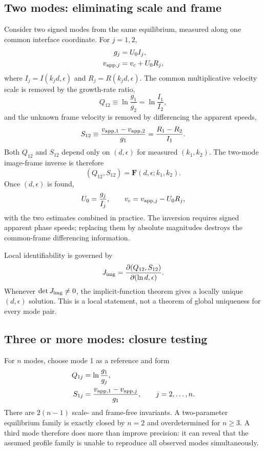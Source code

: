 \documentclass[linenumbers]{aastex7}
\begin{document}
\subsection{Two modes: eliminating scale and frame}
Consider two signed modes from the same equilibrium, measured along one common interface coordinate. For $j=1,2$,
\begin{align}
g_j &= U_0 I_j,\\
v_{{\rm app},j}&=v_c+U_0R_j,
\end{align}
where $I_j=I(k_jd,\epsilon)$ and $R_j=R(k_jd,\epsilon)$. The common multiplicative velocity scale is removed by the growth-rate ratio,
\begin{equation}
Q_{12}\equiv \ln\frac{g_1}{g_2}
=\ln\frac{I_1}{I_2},
\end{equation}
and the unknown frame velocity is removed by differencing the apparent speeds,
\begin{equation}
S_{12}\equiv\frac{v_{{\rm app},1}-v_{{\rm app},2}}{g_1}
=\frac{R_1-R_2}{I_1}.
\end{equation}
Both $Q_{12}$ and $S_{12}$ depend only on $(d,\epsilon)$ for measured $(k_1,k_2)$. The two-mode image-frame inverse is therefore
\begin{equation}
(Q_{12},S_{12})=\mathbf{F}(d,\epsilon;k_1,k_2).
\end{equation}
Once $(d,\epsilon)$ is found,
\begin{equation}
U_0=\frac{g_j}{I_j},\qquad
v_c=v_{{\rm app},j}-U_0R_j,
\end{equation}
with the two estimates combined in practice. The inversion requires signed apparent phase speeds; replacing them by absolute magnitudes destroys the common-frame differencing information.

Local identifiability is governed by
\begin{equation}
J_{\rm img}=\frac{\partial(Q_{12},S_{12})}{\partial(\ln d,\epsilon)}.
\end{equation}
Whenever $\det J_{\rm img}\neq0$, the implicit-function theorem gives a locally unique $(d,\epsilon)$ solution. This is a local statement, not a theorem of global uniqueness for every mode pair.

\subsection{Three or more modes: closure testing}
For $n$ modes, choose mode 1 as a reference and form
\begin{align}
Q_{1j}&=\ln\frac{g_1}{g_j},\\
S_{1j}&=\frac{v_{{\rm app},1}-v_{{\rm app},j}}{g_1},\qquad j=2,\ldots,n.
\end{align}
There are $2(n-1)$ scale- and frame-free invariants. A two-parameter equilibrium family is exactly closed by $n=2$ and overdetermined for $n\geq3$. A third mode therefore does more than improve precision: it can reveal that the assumed profile family is unable to reproduce all observed modes simultaneously.
\end{document}
